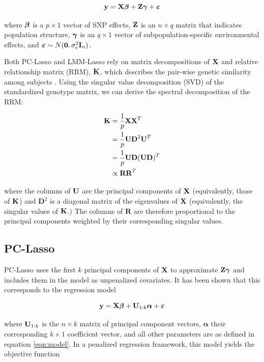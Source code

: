 \begin{equation}
    \label{eqn:model}
    \textbf{y} = \textbf{X}\boldsymbol{\beta} + \textbf{Z}\boldsymbol{\gamma} + \boldsymbol{\varepsilon}
\end{equation}

where $\boldsymbol{\beta}$ is a $p \times 1$ vector of SNP effects, $\textbf{Z}$ is an $n \times q$ matrix that indicates population structure, $\boldsymbol{\gamma}$ is an $q \times 1$ vector of subpopulation-specific environmental effects, and $\boldsymbol{\varepsilon} \sim N(\boldsymbol{0}, \sigma^2_e \textbf{I}_n)$.

Both PC-Lasso and LMM-Lasso rely on matrix decompositions of $\textbf{X}$ and relative relationship matrix (RRM), $\textbf{K}$, which describes the pair-wise genetic similarity among subjects \cite{hayes2009increased}. Using the singular value decomposition (SVD) of the standardized genotype matrix, we can derive the spectral decomposition of the RRM:

\begin{align}
    \label{eqn:k}
    \textbf{K} &= \frac{1}{p} \textbf{X} \textbf{X}^T \nonumber \\
                   &= \frac{1}{p} \textbf{U} \textbf{D}^2 \textbf{U}^T \nonumber \\
                   &= \frac{1}{p} \textbf{U} \textbf{D} (\textbf{U} \textbf{D})^T \nonumber \\
                   &\propto \textbf{R} \textbf{R}^T
\end{align}

where the columns of $\textbf{U}$ are the principal components of $\textbf{X}$ (equivalently, those of $\textbf{K}$) and $\boldsymbol{D}^2$ is a diagonal matrix of the eigenvalues of $\textbf{X}$ (equivalently, the singular values of $\textbf{K}$.) The columns of $\boldsymbol{R}$ are therefore proportional to the principal components weighted by their corresponding singular values. 

\subsection{PC-Lasso}
PC-Lasso uses the first $k$ principal components of $\textbf{X}$ to approximate $\textbf{Z}\boldsymbol{\gamma}$ and includes them in the model as unpenalized covariates. It has been shown \cite{hoffman2013correcting} that this corresponds to the regression model

\begin{equation}
    \label{eqn:pca_reg}
    \textbf{y} = \textbf{X}\boldsymbol{\beta} + \textbf{U}_{1:k}\boldsymbol{\alpha} + \boldsymbol{\varepsilon} 
\end{equation}

where $\textbf{U}_{1:k}$ is the $n \times k$ matrix of principal component vectors, $\boldsymbol{\alpha}$ their corresponding $k \times 1$ coefficient vector, and all other parameters are as defined in equation \ref{eqn:model}. In a penalized regression framework, this model yields the objective function

